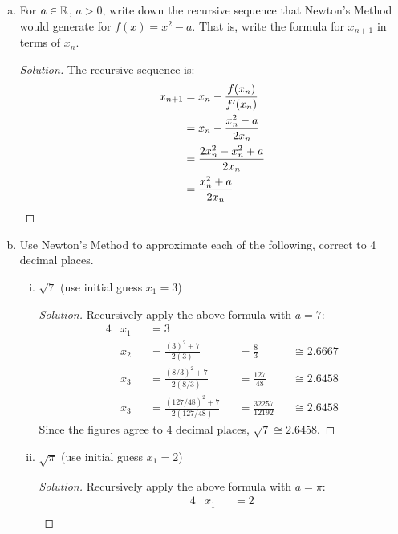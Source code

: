 \documentclass{agony}
\begin{document}
\question \begin{enumerate}[(a)]
  \item For $a\in\mathbb{R}$, $a > 0$, write down the recursive sequence that Newton's Method would generate for $f(x)=x^2-a$.
        That is, write the formula for $x_{n+1}$ in terms of $x_n$.
        \begin{proof}[Solution]
          The recursive sequence is:
          \begin{align*}
            x_{n+1} & = x_n - \frac{f(x_n)}{f'(x_n)}  \\
                    & = x_n - \frac{x_n^2-a}{2x_n}    \\
                    & = \frac{2x_n^2-x_n^2+a}{2x_n}   \\
                    & = \frac{x_n^2+a}{2x_n} \qedhere
          \end{align*}
        \end{proof}
  \item Use Newton's Method to approximate each of the following, correct to 4 decimal places.
        \begin{enumerate}[(i)]
          \item $\sqrt{7}$ (use initial guess $x_1=3$)
                \begin{proof}[Solution]
                  Recursively apply the above formula with $a=7$:
                  \begin{alignat*}{4}
                     & x_1 &  & = 3                                                                           \\
                     & x_2 &  & = \frac{(3)^2+7}{2(3)}           &  & = \frac83             &  & \cong 2.6667 \\
                     & x_3 &  & = \frac{(8/3)^2+7}{2(8/3)}       &  & = \frac{127}{48}      &  & \cong 2.6458 \\
                     & x_3 &  & = \frac{(127/48)^2+7}{2(127/48)} &  & = \frac{32257}{12192} &  & \cong 2.6458
                  \end{alignat*}
                  Since the figures agree to 4 decimal places, $\sqrt{7} \cong 2.6458$.
                \end{proof}
          \item $\sqrt{\pi}$ (use initial guess $x_1=2$)
                \begin{proof}[Solution]
                  Recursively apply the above formula with $a=\pi$:
                  \begin{alignat*}{4}
                     & x_1                              &  & = 2                                                                                  \\

\end{alignat*}
\end{proof}
\end{enumerate}
\end{enumerate}
\end{document}
